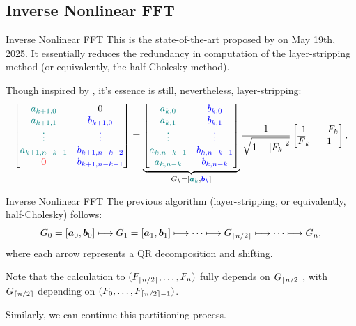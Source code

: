 \subsection{Inverse Nonlinear FFT}
\begin{frame}{Inverse Nonlinear FFT}
    This is the state-of-the-art proposed by \cite{Lin2025} on May 19th, 2025. It essentially reduces the redundancy in computation of the layer-stripping method (or equivalently, the half-Cholesky method).

    Though inspired by \cite{FastToeplitz}, it's essence is still, nevertheless, layer-stripping:
    \begin{equation}
        \left[\begin{matrix}
            \color{teal}a_{k+1,0} & \color{black}0 \\
            \color{teal}a_{k+1,1} & \color{blue}b_{k+1,0} \\
            \color{teal}\vdots & \color{blue}\vdots \\
            \color{teal}a_{k+1,n-k-1} & \color{blue}b_{k+1,n-k-2} \\
            {\color{red}0} & \color{blue}b_{k+1,n-k-1}
        \end{matrix}\right] = \underbrace{\left[\begin{matrix}
            \color{teal}a_{k,0} & \color{blue}b_{k,0} \\
            \color{teal}a_{k,1} & \color{blue}b_{k,1} \\
            \color{teal}\vdots & \color{blue}\vdots \\
            \color{teal}a_{k,n-k-1} & \color{blue}b_{k,n-k-1} \\
            \color{teal}a_{k,n-k} & \color{blue}b_{k,n-k}
        \end{matrix}\right]}_{G_{k} = [{\color{teal}\boldsymbol{a}_k},{\color{blue}\boldsymbol{b}_k}]} \frac{1}{\sqrt{1+\left|{F_k}\right|^2}} \left[\begin{matrix}
            1 & -F_k \\ \overline{F}_k & 1
        \end{matrix}\right].
    \end{equation}
\end{frame}
\begin{frame}{Inverse Nonlinear FFT}
    The previous algorithm (layer-stripping, or equivalently, half-Cholesky) follows:
    \begin{equation*}
        G_0=[\boldsymbol{a}_0,\boldsymbol{b}_0] \longmapsto G_1=[\boldsymbol{a}_1,\boldsymbol{b}_1] \longmapsto \cdots \longmapsto G_{\left\lceil{n/2}\right\rceil} \longmapsto \cdots \longmapsto G_n,
    \end{equation*}
    where each arrow represents a QR decomposition and shifting.

    Note that the calculation to $(F_{\left\lceil{n/2}\right\rceil},\ldots,F_n)$ fully depends on $G_{\left\lceil{n/2}\right\rceil}$, with $G_{\left\lceil{n/2}\right\rceil}$ depending on $(F_0,\ldots,F_{\left\lceil{n/2}\right\rceil-1})$.

    Similarly, we can continue this partitioning process.
    
\end{frame}

